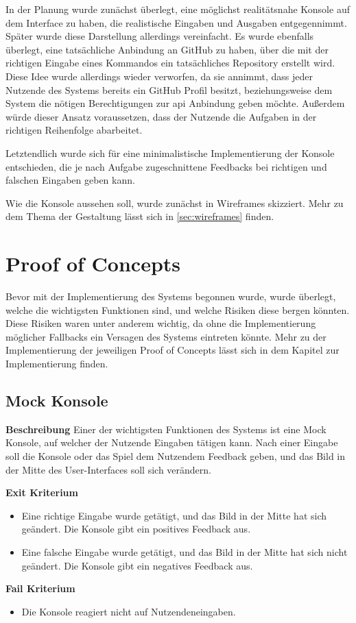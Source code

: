 In der Planung wurde zunächst überlegt, eine möglichst realitätsnahe Konsole auf dem Interface zu haben, die realistische Eingaben und Ausgaben entgegennimmt. Später wurde diese Darstellung allerdings vereinfacht.
Es wurde ebenfalls überlegt, eine tatsächliche Anbindung an GitHub zu haben, über die mit der richtigen Eingabe eines Kommandos ein tatsächliches Repository erstellt wird. Diese Idee wurde allerdings wieder verworfen, da sie annimmt, dass jeder Nutzende des Systems bereits ein GitHub Profil besitzt, beziehungsweise dem System die nötigen Berechtigungen zur \gls{api} Anbindung geben möchte. Außerdem würde dieser Ansatz voraussetzen, dass der Nutzende die Aufgaben in der richtigen Reihenfolge abarbeitet.

Letztendlich wurde sich für eine minimalistische Implementierung der Konsole entschieden, die je nach Aufgabe zugeschnittene Feedbacks bei richtigen und falschen Eingaben geben kann.

\par
Wie die Konsole aussehen soll, wurde zunächst in Wireframes skizziert. Mehr zu dem Thema der Gestaltung lässt sich in \cref{sec:wireframes} finden.

\section{Proof of Concepts}
Bevor mit der Implementierung des Systems begonnen wurde, wurde überlegt, welche die wichtigsten Funktionen sind, und welche Risiken diese bergen könnten. Diese Risiken waren unter anderem wichtig, da ohne die Implementierung möglicher Fallbacks ein Versagen des Systems eintreten könnte.
Mehr zu der Implementierung der jeweiligen Proof of Concepts lässt sich in dem Kapitel zur Implementierung finden.

\subsection{Mock Konsole}
\label{sec:poc_console}
\textbf{Beschreibung}
\newline Einer der wichtigsten Funktionen des Systems ist eine Mock Konsole, auf welcher der Nutzende Eingaben tätigen kann. Nach einer Eingabe soll die Konsole oder das Spiel dem Nutzendem Feedback geben, und das Bild in der Mitte des User-Interfaces soll sich verändern.

\textbf{Exit Kriterium}
\begin{itemize}
    \item Eine richtige Eingabe wurde getätigt, und das Bild in der Mitte hat sich geändert. Die Konsole gibt ein positives Feedback aus.
    \item Eine falsche Eingabe wurde getätigt, und das Bild in der Mitte hat sich nicht geändert. Die Konsole gibt ein negatives Feedback aus.
\end{itemize}
\textbf{Fail Kriterium}
\begin{itemize}
    \item Die Konsole reagiert nicht auf Nutzendeneingaben. 
\end{itemize}

